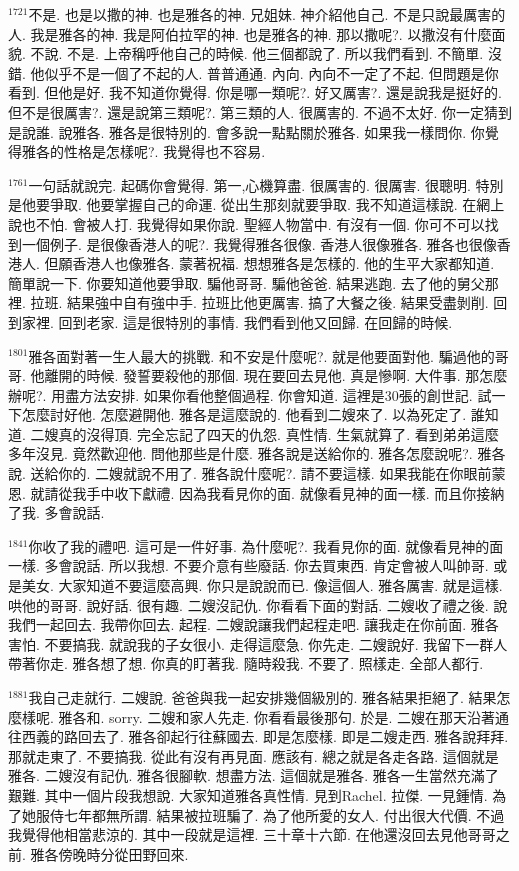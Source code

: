 \documentclass{book}
\begin{document}
$^{1721}$不是.
也是以撒的神.
也是雅各的神.
兄姐妹.
神介紹他自己.
不是只說最厲害的人.
我是雅各的神.
我是阿伯拉罕的神.
也是雅各的神.
那以撒呢?.
以撒沒有什麼面貌.
不說.
不是.
上帝稱呼他自己的時候.
他三個都說了.
所以我們看到.
不簡單.
沒錯.
他似乎不是一個了不起的人.
普普通通.
內向.
內向不一定了不起.
但問題是你看到.
但他是好.
我不知道你覺得.
你是哪一類呢?.
好又厲害?.
還是說我是挺好的.
但不是很厲害?.
還是說第三類呢?.
第三類的人.
很厲害的.
不過不太好.
你一定猜到是說誰.
說雅各.
雅各是很特別的.
會多說一點點關於雅各.
如果我一樣問你.
你覺得雅各的性格是怎樣呢?.
我覺得也不容易.

$^{1761}$一句話就說完.
起碼你會覺得.
第一,心機算盡.
很厲害的.
很厲害.
很聰明.
特別是他要爭取.
他要掌握自己的命運.
從出生那刻就要爭取.
我不知道這樣說.
在網上說也不怕.
會被人打.
我覺得如果你說.
聖經人物當中.
有沒有一個.
你可不可以找到一個例子.
是很像香港人的呢?.
我覺得雅各很像.
香港人很像雅各.
雅各也很像香港人.
但願香港人也像雅各.
蒙著祝福.
想想雅各是怎樣的.
他的生平大家都知道.
簡單說一下.
你要知道他要爭取.
騙他哥哥.
騙他爸爸.
結果逃跑.
去了他的舅父那裡.
拉班.
結果強中自有強中手.
拉班比他更厲害.
搞了大餐之後.
結果受盡剝削.
回到家裡.
回到老家.
這是很特別的事情.
我們看到他又回歸.
在回歸的時候.

$^{1801}$雅各面對著一生人最大的挑戰.
和不安是什麼呢?.
就是他要面對他.
騙過他的哥哥.
他離開的時候.
發誓要殺他的那個.
現在要回去見他.
真是慘啊.
大件事.
那怎麼辦呢?.
用盡方法安排.
如果你看他整個過程.
你會知道.
這裡是30張的創世記.
試一下怎麼討好他.
怎麼避開他.
雅各是這麼說的.
他看到二嫂來了.
以為死定了.
誰知道.
二嫂真的沒得頂.
完全忘記了四天的仇怨.
真性情.
生氣就算了.
看到弟弟這麼多年沒見.
竟然歡迎他.
問他那些是什麼.
雅各說是送給你的.
雅各怎麼說呢?.
雅各說.
送給你的.
二嫂就說不用了.
雅各說什麼呢?.
請不要這樣.
如果我能在你眼前蒙恩.
就請從我手中收下獻禮.
因為我看見你的面.
就像看見神的面一樣.
而且你接納了我.
多會說話.

$^{1841}$你收了我的禮吧.
這可是一件好事.
為什麼呢?.
我看見你的面.
就像看見神的面一樣.
多會說話.
所以我想.
不要介意有些廢話.
你去買東西.
肯定會被人叫帥哥.
或是美女.
大家知道不要這麼高興.
你只是說說而已.
像這個人.
雅各厲害.
就是這樣.
哄他的哥哥.
說好話.
很有趣.
二嫂沒記仇.
你看看下面的對話.
二嫂收了禮之後.
說我們一起回去.
我帶你回去.
起程.
二嫂說讓我們起程走吧.
讓我走在你前面.
雅各害怕.
不要搞我.
就說我的子女很小.
走得這麼急.
你先走.
二嫂說好.
我留下一群人帶著你走.
雅各想了想.
你真的盯著我.
隨時殺我.
不要了.
照樣走.
全部人都行.

$^{1881}$我自己走就行.
二嫂說.
爸爸與我一起安排幾個級別的.
雅各結果拒絕了.
結果怎麼樣呢.
雅各和.
sorry.
二嫂和家人先走.
你看看最後那句.
於是.
二嫂在那天沿著通往西義的路回去了.
雅各卻起行往蘇國去.
即是怎麼樣.
即是二嫂走西.
雅各說拜拜.
那就走東了.
不要搞我.
從此有沒有再見面.
應該有.
總之就是各走各路.
這個就是雅各.
二嫂沒有記仇.
雅各很腳軟.
想盡方法.
這個就是雅各.
雅各一生當然充滿了艱難.
其中一個片段我想說.
大家知道雅各真性情.
見到Rachel.
拉傑.
一見鍾情.
為了她服侍七年都無所謂.
結果被拉班騙了.
為了他所愛的女人.
付出很大代價.
不過我覺得他相當悲涼的.
其中一段就是這裡.
三十章十六節.
在他還沒回去見他哥哥之前.
雅各傍晚時分從田野回來.
\end{document}
